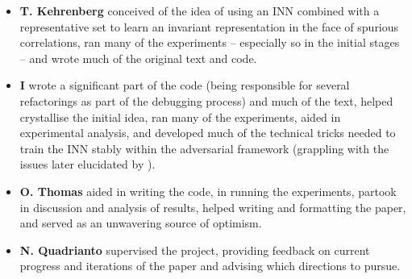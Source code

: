 %
{\renewcommand\labelitemi{}
%
\begin{itemize}
    \item 
        \textbf{T. Kehrenberg} conceived of the idea of using an INN combined with a
        representative set to learn an invariant representation in the face of spurious
        correlations, ran many of the experiments -- especially so in the initial stages -- and
        wrote much of the original text and code.
    \item 
        \textbf{I} wrote a significant part of the code (being responsible for several refactorings
        as part of the debugging process) and much of the text, helped crystallise the initial
        idea, ran many of the experiments, aided in experimental analysis, and developed much of
        the technical tricks needed to train the INN stably within the adversarial framework
        (grappling with the issues later elucidated by \citet{behrmann2021understanding}).
    \item 
        \textbf{O. Thomas} aided in writing the code, in running the experiments, partook in
        discussion and analysis of results, helped writing and formatting the paper, and served as
        an unwavering source of optimism.
    \item
        \textbf{N. Quadrianto} supervised the project, providing feedback on current progress and
        iterations of the paper and advising which directions to pursue.
\end{itemize}
%
}
